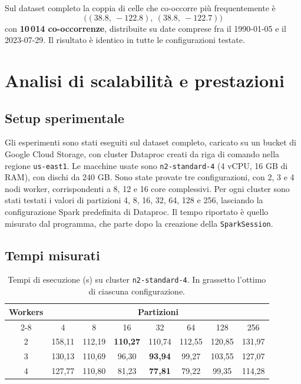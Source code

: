 \documentclass[11pt,a4paper]{article}
\begin{document}
Sul dataset completo la coppia di celle che co-occorre più frequentemente è
\[
\big((38.8,\ -122.8),\ (38.8,\ -122.7)\big)
\]
con \textbf{10\,014 co-occorrenze}, distribuite su date comprese fra il 1990-01-05 e il
2023-07-29. Il risultato è identico in tutte le configurazioni testate.

\section{Analisi di scalabilità e prestazioni}

\subsection{Setup sperimentale}

Gli esperimenti sono stati eseguiti sul dataset completo, caricato su un bucket di Google Cloud
Storage, con cluster Dataproc creati da riga di comando nella regione \texttt{us-east1}. 
Le macchine usate sono \texttt{n2-standard-4} (4 vCPU, 16 GB di RAM), con dischi da 240 GB. 
Sono state provate tre configurazioni, con 2, 3 e 4 nodi worker,
corrispondenti a 8, 12 e 16 core complessivi. Per ogni cluster sono stati testati i valori di
partizioni 4, 8, 16, 32, 64, 128 e 256, lasciando la configurazione Spark predefinita di Dataproc.
Il tempo riportato è quello misurato dal programma, che parte dopo la creazione della \texttt{SparkSession}.

\subsection{Tempi misurati}

\begin{table}[h]
\centering
\small
\caption{Tempi di esecuzione (s) su cluster \texttt{n2-standard-4}. In grassetto l'ottimo di
ciascuna configurazione.}
\begin{tabular}{cccccccc}
\toprule
\textbf{Workers} & \multicolumn{7}{c}{\textbf{Partizioni}} \\
\cmidrule(lr){2-8}
 & 4 & 8 & 16 & 32 & 64 & 128 & 256 \\
\midrule
2 & 158,11 & 112,19 & \textbf{110,27} & 110,74 & 112,55 & 120,85 & 131,97 \\
3 & 130,13 & 110,69 & 96,30 & \textbf{93,94} & 99,27 & 103,55 & 127,07 \\
4 & 127,77 & 110,80 & 81,23 & \textbf{77,81} & 79,22 & 99,35 & 114,28 \\
\bottomrule
\end{tabular}
\end{table}
\end{document}
